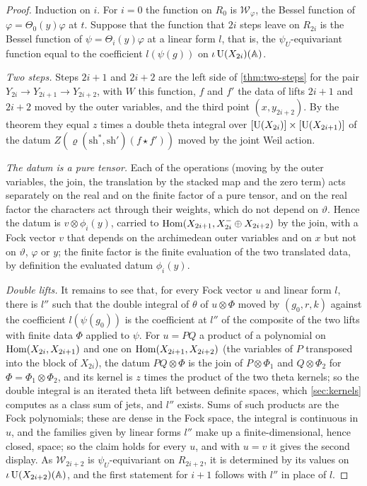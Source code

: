 \begin{proof}
Induction on $i$. For $i=0$ the function on $R_0$ is $\mathcal W_\varphi$, the Bessel function of $\varphi=\Theta_0(y)\varphi$ at $t$. Suppose that the function that $2i$ steps leave on $R_{2i}$ is the Bessel function of $\psi=\Theta_i(y)\varphi$ at a linear form $l$, that is, the $\psi_U$-equivariant function equal to the
coefficient $l(\psi(g))$ on $\iota\operatorname{U}(X_{2i})(\mathbb{A})$.

\emph{Two steps.} Steps $2i+1$ and $2i+2$ are the left side of \cref{thm:two-steps} for the pair $Y_{2i}\to Y_{2i+1}\to Y_{2i+2}$, with $W$ this function, $f$ and $f'$ the data of lifts $2i+1$ and $2i+2$ moved by the outer variables, and the third point $(x,y_{2i+2})$. By the theorem they equal $z$ times a
double theta integral over $[\operatorname{U}(X_{2i})]\times[\operatorname{U}(X_{2i+1})]$ of the datum $Z(\varrho(\mathrm{sh}^*,\mathrm{sh}')(f\star f'))$ moved by the joint Weil action.

\emph{The datum is a pure tensor.} Each of the operations (moving by the outer variables, the join, the translation by the stacked map and the zero term) acts separately on the real and on the finite factor of a pure tensor, and on the real factor the characters act through their weights, which do not depend on $\vartheta$. Hence the datum is
$v\otimes\phi_i(y)$, carried to $\operatorname{Hom}(X_{2i+1},X_{2i}^-\oplus X_{2i+2})$ by the join, with a Fock vector $v$ that depends on the archimedean outer variables and on $x$ but not on $\vartheta$, $\varphi$ or $y$; the finite factor is the finite evaluation of the two translated data, by definition the evaluated datum $\phi_i(y)$.

\emph{Double lifts.} It remains to see that, for every Fock vector $u$ and linear form $l$, there is $l''$ such that the double integral of $\theta$ of $u\otimes\Phi$ moved by $(g_0,r,k)$ against the coefficient $l(\psi(g_0))$ is the coefficient at $l''$ of the composite of the two lifts with finite data $\Phi$ applied to $\psi$. For $u=PQ$ a
product of a polynomial on $\operatorname{Hom}(X_{2i},X_{2i+1})$ and one on $\operatorname{Hom}(X_{2i+1},X_{2i+2})$ (the variables of $P$ transposed into the block of $X_{2i}$), the datum $PQ\otimes\Phi$ is the join of $P\otimes\Phi_1$ and $Q\otimes\Phi_2$ for $\Phi=\Phi_1\otimes\Phi_2$, and its kernel is $z$ times the product of the two theta kernels; so the double integral is
an iterated theta lift between definite spaces, which \cref{sec:kernels} computes as a class sum of jets, and $l''$ exists. Sums of such products are the Fock polynomials; these are dense in the Fock space, the integral is continuous in $u$, and the families given by linear forms $l''$ make up a finite-dimensional, hence closed, space; so the
claim holds for every $u$, and with $u=v$ it gives the second display. As $\mathcal W_{2i+2}$ is $\psi_U$-equivariant on $R_{2i+2}$, it is determined by its values on $\iota\operatorname{U}(X_{2i+2})(\mathbb{A})$, and the first statement for $i+1$ follows with $l''$ in place of $l$.
\end{proof}

